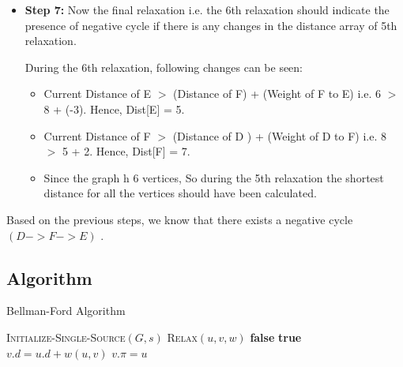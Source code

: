 \documentclass[lettersize,journal]{IEEEtran}
\begin{document}
\begin{itemize}
    \item {\textbf{Step 7:} Now the final relaxation i.e. the 6th relaxation should indicate the presence of negative cycle if there is any changes in the distance array of 5th relaxation.

    During the 6th relaxation, following changes can be seen:
    }
    \begin{itemize}
        \item {Current Distance of E \(>\) (Distance of F) + (Weight of F to E) i.e. 6 \(>\) 8 + (-3). Hence, Dist[E] = 5.}
        \item {Current Distance of F \(>\) (Distance of D ) + (Weight of D to F) i.e. 8 \(>\) 5 + 2. Hence, Dist[F] = 7.}
        \item {Since the graph h 6 vertices, So during the 5th relaxation the shortest distance for all the vertices should have been calculated.}
    \end{itemize}
    
\end{itemize}

Based on the previous steps, we know that there exists a negative cycle \( (D-> F-> E) \) \cite{bellmanford_gfg}.

\subsection{Algorithm}

\begin{algorithm}
\caption{Bellman-Ford Algorithm}\label{alg:bellman-ford}
\begin{algorithmic}
\State \textsc{Initialize-Single-Source}$(G,s)$
        \State \textsc{Relax}$(u, v, w)$
    \EndFor
\EndFor
{}
        \State \Return \textbf{false}
    \EndIf
\EndFor
\State \Return \textbf{true}
\EndProcedure
\Statex
{}
        \State $v.d = u.d + w(u, v)$
        \State $v.\pi = u$
    \EndIf
\EndProcedure
\end{algorithmic}
\end{algorithm}
\end{document}

